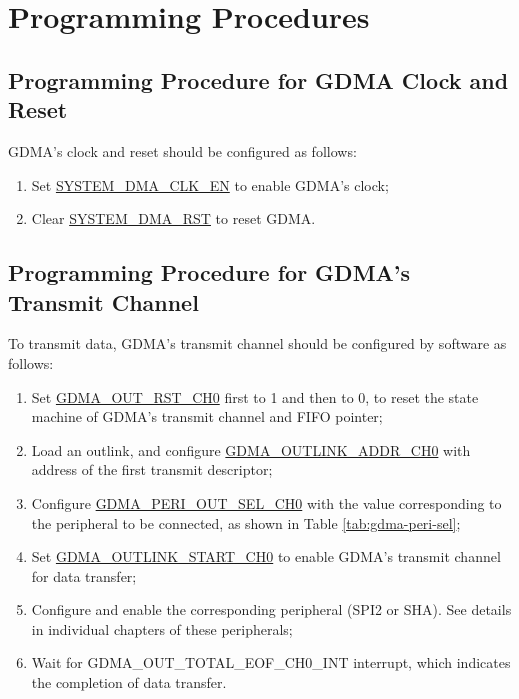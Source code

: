 \documentclass[main\_\_EN.tex]{subfiles}
\begin{document}
\section{Programming Procedures}

\subsection{Programming Procedure for GDMA Clock and Reset}

GDMA's clock and reset should be configured as follows:
\begin{enumerate}
    \item Set \hyperref[fielddesc:SYSTEMDMACLKEN]{SYSTEM\_DMA\_CLK\_EN} to enable GDMA's clock;
    \item Clear \hyperref[fielddesc:SYSTEMDMARST]{SYSTEM\_DMA\_RST} to reset GDMA.
\end{enumerate}

\subsection{Programming Procedure for GDMA's Transmit Channel}\label{tx-program}

To transmit data, GDMA's transmit channel should be configured by software as follows:
\begin{enumerate}
    \item Set \hyperref[fielddesc:GDMAOUTRSTCH0]{GDMA\_OUT\_RST\_CH0} first to 1 and then to 0, to reset the state machine of GDMA's transmit channel and FIFO pointer;
    \item Load an outlink, and configure \hyperref[fielddesc:GDMAOUTLINKADDRCH0]{GDMA\_OUTLINK\_ADDR\_CH0}  with address of the first transmit descriptor;
    \item Configure \hyperref[fielddesc:GDMAPERIOUTSELCH0]{GDMA\_PERI\_OUT\_SEL\_CH0} with the value corresponding to the peripheral to be connected, as shown in Table \ref{tab:gdma-peri-sel};
    \item Set \hyperref[fielddesc:GDMAOUTLINKSTARTCH0]{GDMA\_OUTLINK\_START\_CH0} to enable GDMA's transmit channel for data transfer;
    \item Configure and enable the corresponding peripheral (SPI2 or SHA). See details in individual chapters of these peripherals;
    \item Wait for GDMA\_OUT\_TOTAL\_EOF\_CH0\_INT interrupt, which indicates the completion of data transfer.
\end{enumerate}
\end{document}
